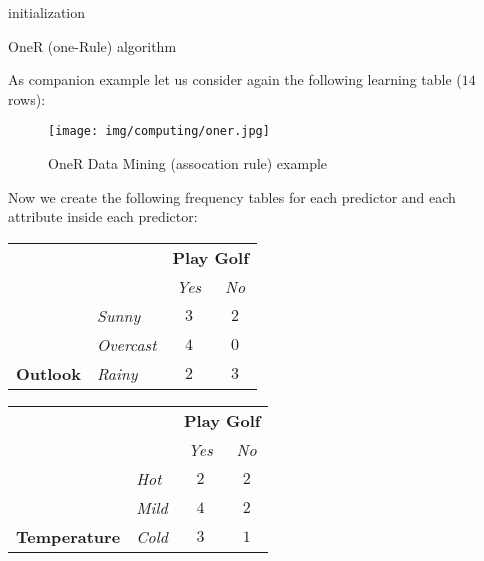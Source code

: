 	\begin{algorithm}[H]
	 initialization\;
	 \caption{OneR (one-Rule) algorithm}
	\end{algorithm}
	As companion example let us consider again the following learning table ($14$ rows):
	\begin{figure}[H]
		\centering
		\texttt{[image: img/computing/oner.jpg]}
		\caption{OneR Data Mining (assocation rule) example}
	\end{figure}
	
	Now we create the following frequency tables for each predictor and each attribute inside each predictor:
	\begin{table}[H]
		\centering
		\begin{tabular}{|l|l|c|c|}
		\hline
		\multicolumn{2}{|l|}{} & \multicolumn{2}{l|}{\cellcolor[HTML]{FFCCC9}\textbf{Play Golf}} \\ \cline{3-4} 
		\multicolumn{2}{|l|}{\multirow{-2}{*}{}} & \cellcolor[HTML]{FFCCC9}\textit{Yes} & \cellcolor[HTML]{FFCCC9}\textit{No} \\ \hline
		\cellcolor[HTML]{ECF4FF} & \cellcolor[HTML]{ECF4FF}\textit{Sunny} & $3$ & $2$ \\ \cline{2-4} 
		\cellcolor[HTML]{ECF4FF} & \cellcolor[HTML]{ECF4FF}\textit{Overcast} & $4$ & $0$ \\ \cline{2-4} 
		\multirow{-3}{*}{\cellcolor[HTML]{ECF4FF}\textbf{\phantom{x} Outlook \phantom{xx}}} & \cellcolor[HTML]{ECF4FF}\textit{Rainy} & $2$ & $3$ \\ \hline
		\end{tabular}
	\end{table}
	\begin{table}[H]
		\centering
		\begin{tabular}{|l|l|c|c|}
		\hline
		\multicolumn{2}{|l|}{} & \multicolumn{2}{l|}{\cellcolor[HTML]{FFCCC9}\textbf{Play Golf}} \\ \cline{3-4} 
		\multicolumn{2}{|l|}{\multirow{-2}{*}{}} & \cellcolor[HTML]{FFCCC9}\textit{Yes} & \cellcolor[HTML]{FFCCC9}\textit{No} \\ \hline
		\cellcolor[HTML]{ECF4FF} & \cellcolor[HTML]{ECF4FF}\textit{Hot} & $2$ & $2$ \\ \cline{2-4} 
		\cellcolor[HTML]{ECF4FF} & \cellcolor[HTML]{ECF4FF}\textit{Mild\phantom{xxxx}} & $4$ & $2$ \\ \cline{2-4} 
		\multirow{-3}{*}{\cellcolor[HTML]{ECF4FF}\textbf{Temperature}} & \cellcolor[HTML]{ECF4FF}\textit{Cold} & $3$ & $1$ \\ \hline
		\end{tabular}
	\end{table}
	
